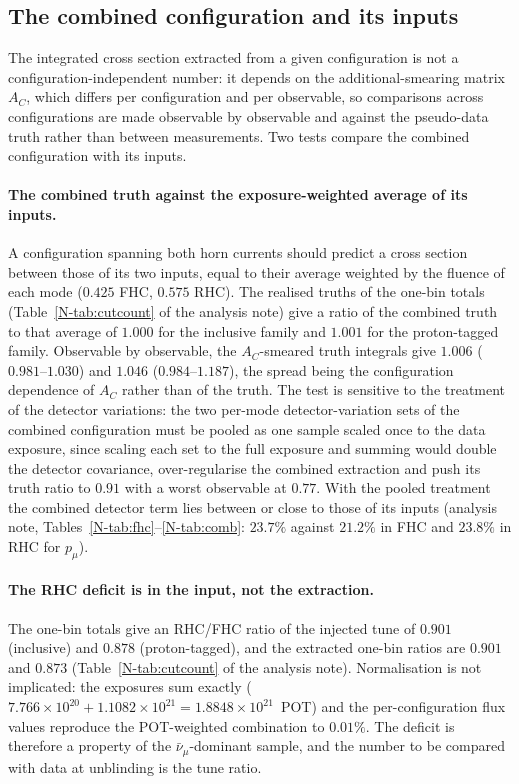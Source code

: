 \documentclass[11pt,a4paper]{article}
\newcommand{\noteref}[2]{#1~\ref{N-#2} of the analysis note}
\begin{document}
\subsection{The combined configuration and its inputs}
\label{sec:combtruth}

The integrated cross section extracted from a given configuration is not a
configuration-independent number: it depends on the additional-smearing matrix $A_C$,
which differs per configuration and per observable, so comparisons across configurations
are made observable by observable and against the pseudo-data truth rather than between
measurements. Two tests compare the combined configuration with its inputs.

\paragraph{The combined truth against the exposure-weighted average of its inputs.}
A configuration spanning both horn currents should predict a cross section between those
of its two inputs, equal to their average weighted by the fluence of each mode ($0.425$ FHC,
$0.575$ RHC). The realised truths of the one-bin totals (\noteref{Table}{tab:cutcount}) give a
ratio of the combined truth to that average of $1.000$ for the inclusive family and $1.001$ for the
proton-tagged family. Observable by observable, the $A_C$-smeared truth integrals give
$1.006$ ($0.981$--$1.030$) and $1.046$ ($0.984$--$1.187$), the spread being the configuration
dependence of $A_C$ rather than of the truth. The test is sensitive to the treatment of the
detector variations: the two per-mode detector-variation sets of the combined configuration
must be pooled as one sample scaled once to the data exposure, since scaling each set to the full
exposure and summing would double the detector covariance, over-regularise the combined
extraction and push its truth ratio to $0.91$ with a worst observable at $0.77$. With the
pooled treatment the combined detector term lies between or close to those of its inputs
(analysis note, Tables~\ref{N-tab:fhc}--\ref{N-tab:comb}: $23.7\%$ against $21.2\%$ in FHC and
$23.8\%$ in RHC for $p_\mu$).

\paragraph{The RHC deficit is in the input, not the extraction.}
The one-bin totals give an RHC/FHC ratio of the injected tune of $0.901$
(inclusive) and $0.878$ (proton-tagged), and the extracted one-bin ratios are $0.901$ and
$0.873$ (\noteref{Table}{tab:cutcount}). Normalisation is not implicated: the exposures
sum exactly ($7.766\times10^{20}+1.1082\times10^{21}=1.8848\times10^{21}$~POT) and the
per-configuration flux values reproduce the POT-weighted combination to $0.01\%$. The
deficit is therefore a property of the $\bar\nu_\mu$-dominant sample, and the number
to be compared with data at unblinding is the tune ratio.
\end{document}

